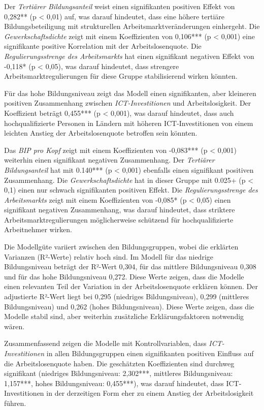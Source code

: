 Der \textit{Tertiärer Bildungsanteil} weist einen signifikanten positiven Effekt von 0,282** 
(p < 0,01) auf, was darauf hindeutet, dass eine höhere tertiäre Bildungsbeteiligung mit strukturellen 
Arbeitsmarktveränderungen einhergeht. Die \textit{Gewerkschaftsdichte} zeigt mit einem Koeffizienten 
von 0,106*** (p < 0,001) eine signifikante positive Korrelation mit der Arbeitslosenquote. Die 
\textit{Regulierungsstrenge des Arbeitsmarkts} hat einen signifikant negativen Effekt von -0,118* 
(p < 0,05), was darauf hindeutet, dass strengere Arbeitsmarktregulierungen für diese Gruppe 
stabilisierend wirken könnten.

Für das hohe Bildungsniveau zeigt das Modell einen signifikanten, aber kleineren positiven 
Zusammenhang zwischen \textit{\ac{ICT}-Investitionen} und Arbeitslosigkeit. Der Koeffizient beträgt 
0,455*** (p < 0,001), was darauf hindeutet, dass auch hochqualifizierte Personen in Ländern mit 
höheren \ac{ICT}-Investitionen von einem leichten Anstieg der Arbeitslosenquote betroffen sein 
könnten.

Das \textit{\ac{BIP} pro Kopf} zeigt mit einem Koeffizienten von -0,083*** (p < 0,001) weiterhin 
einen signifikant negativen Zusammenhang. Der \textit{Tertiärer Bildungsanteil} hat mit 0.140*** 
(p < 0,001) ebenfalls einen signifikant positiven Zusammenhang. Die \textit{Gewerkschaftsdichte} hat 
in dieser Gruppe mit 0.025+ (p < 0,1) einen nur schwach signifikanten positiven Effekt. Die 
\textit{Regulierungsstrenge des Arbeitsmarkts} zeigt mit einem Koeffizienten von -0,085* 
(p < 0,05) einen signifikant negativen Zusammenhang, was darauf hindeutet, dass striktere 
Arbeitsmarktregulierungen möglicherweise schützend für hochqualifizierte Arbeitnehmer wirken.

Die Modellgüte variiert zwischen den Bildungsgruppen, wobei die erklärten Varianzen (R²-Werte) 
relativ hoch sind. Im Modell für das niedrige Bildungsniveau beträgt der R²-Wert 0,304, für das 
mittlere Bildungsniveau 0,308 und für das hohe Bildungsniveau 0,272. Diese Werte zeigen, dass die 
Modelle einen relevanten Teil der Variation in der Arbeitslosenquote erklären können. Der adjustierte 
R²-Wert liegt bei 0,295 (niedriges Bildungsniveau), 0,299 (mittleres Bildungsniveau) und 0,262 
(hohes Bildungsniveau). Diese Werte zeigen, dass die Modelle stabil sind, aber weiterhin zusätzliche 
Erklärungsfaktoren notwendig wären.

Zusammenfassend zeigen die Modelle mit Kontrollvariablen, dass \textit{\ac{ICT}-Investitionen} 
in allen Bildungsgruppen einen signifikanten positiven Einfluss auf die Arbeitslosenquote haben. 
Die geschätzten Koeffizienten sind durchweg signifikant (niedriges Bildungsniveau: 2,302***, 
mittleres Bildungsniveau: 1,157***, hohes Bildungsniveau: 0,455***), was darauf hindeutet, dass 
\ac{ICT}-Investitionen in der derzeitigen Form eher zu einem Anstieg der Arbeitslosigkeit führen.

